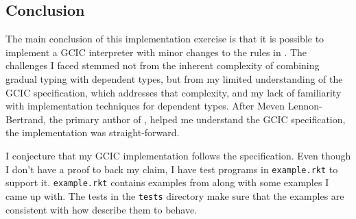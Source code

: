 \documentclass{article}
\theoremstyle{definition}
\begin{document}
\subsection{Conclusion}

The main conclusion of this implementation exercise is that it is possible to
implement a GCIC interpreter with minor changes to the rules in
\citet{lennon-bertrand_gradualizing_2022}. The challenges I faced stemmed not
from the inherent complexity of combining gradual typing with dependent types,
but from my limited understanding of the GCIC specification, which addresses
that complexity, and my lack of familiarity with implementation techniques for
dependent types. After Meven Lennon-Bertrand, the primary author of
\citet{lennon-bertrand_gradualizing_2022}, helped me understand the GCIC
specification, the implementation was straight-forward.

I conjecture that my GCIC implementation follows the specification. Even though
I don't have a proof to back my claim, I have test programs in
\texttt{example.rkt} to support it. \texttt{example.rkt} contains examples from
\citet{lennon-bertrand_gradualizing_2022} along with some examples I came up
with. The tests in the \texttt{tests} directory make sure that the examples are
consistent with how \citet{lennon-bertrand_gradualizing_2022} describe them to
behave.

%
\end{document}
